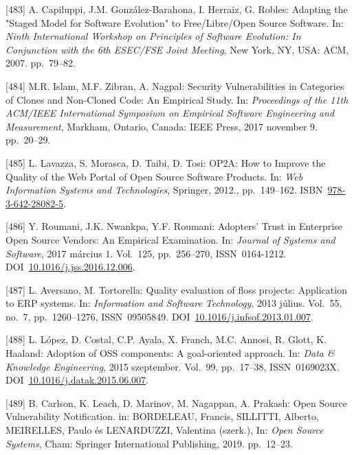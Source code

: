 \documentclass[12pt,magyar,a4paper,oneside]{scrreprt}
\newenvironment{cslreferences}%
  {}%
  {\par}
\begin{document}
\begin{cslreferences}
\leavevmode\hypertarget{ref-capiluppi_adapting_2007}{}%
{[}483{]} A. Capiluppi, J.M. González-Barahona, I. Herraiz, G. Robles:
Adapting the "Staged Model for Software Evolution" to Free/Libre/Open
Source Software. In: \emph{Ninth International Workshop on Principles of
Software Evolution: In Conjunction with the 6th ESEC/FSE Joint Meeting},
New York, NY, USA: ACM, 2007. pp.~79--82.

\leavevmode\hypertarget{ref-islam_security_2017}{}%
{[}484{]} M.R. Islam, M.F. Zibran, A. Nagpal: Security Vulnerabilities
in Categories of Clones and Non-Cloned Code: An Empirical Study. In:
\emph{Proceedings of the 11th ACM/IEEE International Symposium on
Empirical Software Engineering and Measurement}, Markham, Ontario,
Canada: IEEE Press, 2017 november 9. pp.~20--29.

\leavevmode\hypertarget{ref-lavazza_op2a_2012}{}%
{[}485{]} L. Lavazza, S. Morasca, D. Taibi, D. Tosi: OP2A: How to
Improve the Quality of the Web Portal of Open Source Software Products.
In: \emph{Web Information Systems and Technologies}, Springer, 2012.,
pp.~149--162.
ISBN~\href{https://worldcat.org/isbn/978-3-642-28082-5}{978-3-642-28082-5}.

\leavevmode\hypertarget{ref-roumani_adopters_2017}{}%
{[}486{]} Y. Roumani, J.K. Nwankpa, Y.F. Roumani: Adopters' Trust in
Enterprise Open Source Vendors: An Empirical Examination. In:
\emph{Journal of Systems and Software}, 2017 március 1. Vol.~125,
pp.~256--270, ISSN~0164-1212.
DOI~\href{https://doi.org/10.1016/j.jss.2016.12.006}{10.1016/j.jss.2016.12.006}.

\leavevmode\hypertarget{ref-aversano_quality_2013}{}%
{[}487{]} L. Aversano, M. Tortorella: Quality evaluation of floss
projects: Application to ERP systems. In: \emph{Information and Software
Technology}, 2013 július. Vol.~55, no.~7, pp.~1260--1276, ISSN~09505849.
DOI~\href{https://doi.org/10.1016/j.infsof.2013.01.007}{10.1016/j.infsof.2013.01.007}.

\leavevmode\hypertarget{ref-lopez_adoption_2015}{}%
{[}488{]} L. López, D. Costal, C.P. Ayala, X. Franch, M.C. Annosi, R.
Glott, K. Haaland: Adoption of OSS components: A goal-oriented approach.
In: \emph{Data \& Knowledge Engineering}, 2015 szeptember. Vol.~99,
pp.~17--38, ISSN~0169023X.
DOI~\href{https://doi.org/10.1016/j.datak.2015.06.007}{10.1016/j.datak.2015.06.007}.

\leavevmode\hypertarget{ref-carlson_open_2019}{}%
{[}489{]} B. Carlson, K. Leach, D. Marinov, M. Nagappan, A. Prakash:
Open Source Vulnerability Notification. in: BORDELEAU, Francis,
SILLITTI, Alberto, MEIRELLES, Paulo és LENARDUZZI, Valentina (szerk.),
In: \emph{Open Source Systems}, Cham: Springer International Publishing,
2019. pp.~12--23.


\end{cslreferences}
\end{document}
